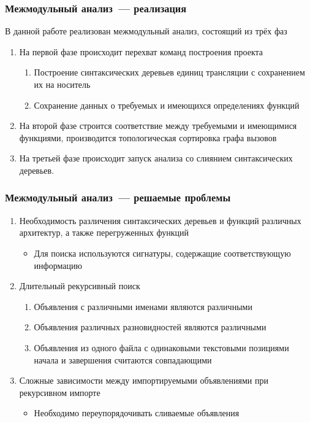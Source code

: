 \documentclass[14pt]{beamer}
\begin{document}
\begin{frame}
\frametitle{Межмодульный анализ~--- реализация}
В данной работе реализован межмодульный анализ, состоящий из трёх фаз
\begin{enumerate}
  \item На первой фазе происходит перехват команд построения проекта
  \begin{enumerate}
    \item Построение синтаксических деревьев единиц трансляции с сохранением их на носитель
    \item Сохранение данных о требуемых и имеющихся определениях функций
  \end{enumerate}
  \item На второй фазе строится соответствие между требуемыми и имеющимися функциями, производится топологическая сортировка графа вызовов
  \item На третьей фазе происходит запуск анализа со слиянием синтаксических деревьев.
\end{enumerate}
\end{frame}

\begin{frame}[allowframebreaks]
\frametitle{Межмодульный анализ~--- решаемые проблемы}
\begin{enumerate}
  \item Необходимость различения синтаксических деревьев и функций различных архитектур, а также перегруженных функций
    \begin{itemize}
      \item Для поиска используются сигнатуры, содержащие соответствующую информацию
    \end{itemize}
  \item Длительный рекурсивный поиск
  \begin{enumerate}
    \item Объявления с различными именами являются различными
    \item Объявления различных разновидностей являются различными
    \item Объявления из одного файла с одинаковыми текстовыми позициями начала и завершения считаются совпадающими
  \end{enumerate}
  \item Сложные зависимости между импортируемыми объявлениями при рекурсивном импорте
    \begin{itemize}
      \item Необходимо переупорядочивать сливаемые объявления
    \end{itemize}
\end{enumerate}
\end{frame}
\end{document}
